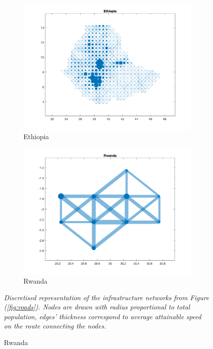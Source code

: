 \documentclass[11pt, oneside]{article}   	%
\let\oldref\ref
\renewcommand{\ref}[1]{(\oldref{#1})}
\newcommand{\mysubcaption}[1]{
\justify
\begin{spacing}{0.7}
\textit{\footnotesize #1}
\end{spacing}}
\begin{document}
\begin{figure}[p]
\begin{subfigure}[c]{0.45\textwidth}
\includegraphics[width=\textwidth, trim={2cm 1cm 1.5cm 0cm},clip]{../../Build/output/Matlab_graphs/Nicer_graphs/Ethiopia_stat.png}
\caption{Ethiopia}
\label{fig:Ethiopia_mat}
\end{subfigure}
\begin{subfigure}[c]{0.45\textwidth}
\includegraphics[width=\textwidth, trim={2cm 1cm 1.5cm 0cm},clip]{../../Build/output/Matlab_graphs/Nicer_graphs/Rwanda_stat.png}
\caption{Rwanda}
\label{fig:Rwanda_mat}
\end{subfigure}
\mysubcaption{Discretised representation of the infrastructure networks from Figure \ref{fig:roads}. Nodes are drawn with radius proportional to total population, edges' thickness correspond to average attainable speed on the route connecting the nodes.}
\label{fig:matlab_networks}
\end{figure}
\end{document}
